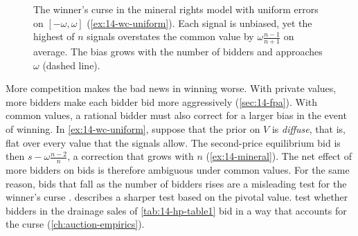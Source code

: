 \begin{figure}[htbp]
\centering
{}
\caption{The winner's curse in the mineral rights model with uniform errors on $[-\omega,\omega]$
(\cref{ex:14-wc-uniform}). Each signal is unbiased, yet the highest of $n$ signals overstates the common
value by $\omega\frac{n-1}{n+1}$ on average. The bias grows with the number of bidders and approaches
$\omega$ (dashed line).}
\label{fig:14-wc}
\end{figure}

More competition makes the bad news in winning worse. With private values, more bidders make each bidder
bid more aggressively (\cref{sec:14-fpa}). With common values, a rational bidder must also correct for a
larger bias in the event of winning. In \cref{ex:14-wc-uniform}, suppose that the prior on $V$ is
\emph{diffuse}, that is, flat over every value that the signals allow. The
second-price equilibrium bid is then $s-\omega\frac{n-2}{n}$, a correction that grows with $n$
(\cref{ex:14-mineral}). The net effect of more bidders on bids is therefore ambiguous under common values.
For the same reason, bids that fall as the number of bidders rises are a misleading test for the winner's
curse \citep{Laffont1997}.  describes a sharper test based on the pivotal value.
\citet{HendricksPorter1988} test whether bidders in the drainage sales of \cref{tab:14-hp-table1} bid in a
way that accounts for the curse (\cref{ch:auction-empirics}).

